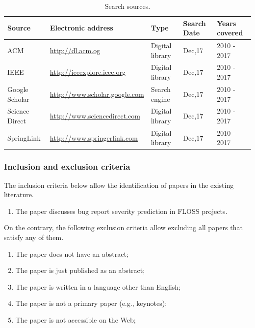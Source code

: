 \begin{table}[!htbp]
  \centering
  \caption{Search sources.}
  \begin{tabular}{@{}lllll@{}} 
    \toprule
    \textbf{Source} & \textbf{Electronic address} & \textbf{Type} & \textbf{Search Date} & \textbf{Years covered}\\ 
    \midrule
    ACM              &  \url{http://dl.acm.og}     & Digital library   & Dec,17 & 2010 - 2017\\ 
    IEEE             &  \url{http://ieeexplore.ieee.org}               & Digital library   & Dec,17 & 2010 - 2017\\ 
    Google Scholar   &  \url{http://www.scholar.google.com}  & Search engine     & Dec,17 & 2010 - 2017\\ 
    Science Direct   &  \url{http://www.sciencedirect.com}   & Digital library   & Dec,17 & 2010 - 2017\\
    SpringLink       &  \url{http://www.springerlink.com}    & Digital library   & Dec,17 & 2010 - 2017\\
    \bottomrule
  \end{tabular}
  \label{tab:search_sources}
\end{table}

\subsubsection{Inclusion and exclusion criteria}\label{subsubsec:criteria}
The inclusion criteria below allow the identification of papers in the existing literature.

\begin{center}
  \begin{enumerate}[label=\textbf{ IC$_\arabic*$}., leftmargin=1.1cm]
    \item The paper discusses bug report severity prediction in FLOSS projects.
  \end{enumerate}
\end{center}

On the contrary, the following exclusion criteria allow excluding all papers that satisfy any of them.

\begin{enumerate}[label=\textbf{ EC$_\arabic*$}., leftmargin=1.1cm]
  \item The paper does not have an abstract;
  \item The paper is just published as an abstract;
  \item The paper is written in a language other than English;
  \item The paper is not a primary paper (e.g., keynotes);
  \item The paper is not accessible on the Web;
\end{enumerate}


